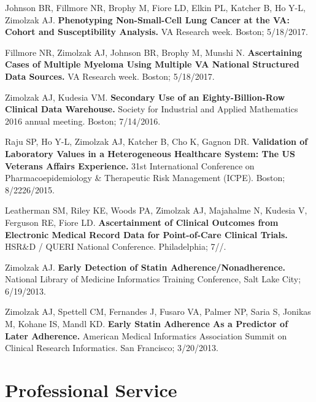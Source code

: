 \documentclass[10pt]{article}
\begin{document}
Johnson BR, Fillmore NR, Brophy M, Fiore LD, Elkin PL, Katcher B, Ho
Y-L, Zimolzak AJ. \textbf{Phenotyping Non-Small-Cell Lung Cancer at
  the VA: Cohort and Susceptibility Analysis.} VA Research week.
Boston; 5/18/2017.

Fillmore NR, Zimolzak AJ, Johnson BR, Brophy M, Munshi N.
\textbf{Ascertaining Cases of Multiple Myeloma Using Multiple VA
  National Structured Data Sources.} VA Research week. Boston;
5/18/2017.

Zimolzak AJ, Kudesia VM. \textbf{Secondary Use of an
  Eighty-Billion-Row Clinical Data Warehouse.} Society for Industrial
and Applied Mathematics 2016 annual meeting. Boston; 7/14/2016.

Raju SP, Ho Y-L, Zimolzak AJ, Katcher B, Cho K, Gagnon DR.
\textbf{Validation of Laboratory Values in a Heterogeneous Healthcare
  System: The US Veterans Affairs Experience.} 31st International
Conference on Pharmacoepidemiology \& Therapeutic Risk Management
(ICPE). Boston; 8/22\ndash{}26/2015.

Leatherman SM, Riley KE, Woods PA, Zimolzak AJ, Majahalme N, Kudesia
V, Ferguson RE, Fiore LD. \textbf{Ascertainment of Clinical Outcomes
  from Electronic Medical Record Data for Point-of-Care Clinical
  Trials.} HSR\&D / QUERI National Conference. Philadelphia;
7/\ndash{}/.

Zimolzak AJ. \textbf{Early Detection of Statin
  Adherence/Nonadherence.} National Library of Medicine Informatics
Training Conference, Salt Lake City; 6/19/2013.

Zimolzak AJ, Spettell CM, Fernandes J, Fusaro VA, Palmer NP, Saria S,
Jonikas M, Kohane IS, Mandl KD. \textbf{Early Statin Adherence As a
  Predictor of Later Adherence.} American Medical Informatics
Association Summit on Clinical Research Informatics. San Francisco;
3/20/2013.




\section*{Professional Service}
\end{document}
